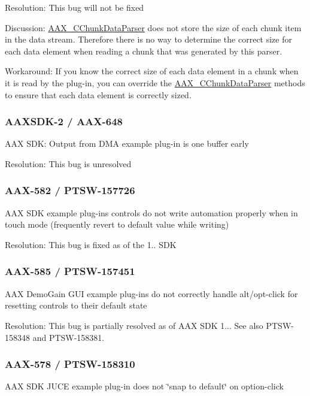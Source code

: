 Resolution\+: This bug will not be fixed

Discussion\+: \hyperlink{a00014}{A\+A\+X\+\_\+\+C\+Chunk\+Data\+Parser} does not store the size of each chunk item in the data stream. Therefore there is no way to determine the correct size for each data element when reading a chunk that was generated by this parser.

Workaround\+: If you know the correct size of each data element in a chunk when it is read by the plug-\/in, you can override the \hyperlink{a00014}{A\+A\+X\+\_\+\+C\+Chunk\+Data\+Parser} methods to ensure that each data element is correctly sized.\hypertarget{a00374_AAXSDK-2}{}\subsubsection{A\+A\+X\+S\+D\+K-\/2 / A\+A\+X-\/648}\label{a00374_AAXSDK-2}
A\+A\+X S\+D\+K\+: Output from D\+M\+A example plug-\/in is one buffer early

Resolution\+: This bug is unresolved\hypertarget{a00374_AAX-582}{}\subsubsection{A\+A\+X-\/582 / P\+T\+S\+W-\/157726}\label{a00374_AAX-582}
A\+A\+X S\+D\+K example plug-\/ins\textquotesingle{} controls do not write automation properly when in \textquotesingle{}touch\textquotesingle{} mode (frequently revert to default value while writing)

Resolution\+: This bug is fixed as of the 1.. S\+D\+K\hypertarget{a00374_AAX-585}{}\subsubsection{A\+A\+X-\/585 / P\+T\+S\+W-\/157451}\label{a00374_AAX-585}
A\+A\+X Demo\+Gain G\+U\+I example plug-\/ins do not correctly handle alt/opt-\/click for resetting controls to their default state

Resolution\+: This bug is partially resolved as of A\+A\+X S\+D\+K 1... See also P\+T\+S\+W-\/158348 and P\+T\+S\+W-\/158381.\hypertarget{a00374_AAX-578}{}\subsubsection{A\+A\+X-\/578 / P\+T\+S\+W-\/158310}\label{a00374_AAX-578}
A\+A\+X S\+D\+K J\+U\+C\+E example plug-\/in does not \char`\"{}snap to default\char`\"{} on option-\/click

